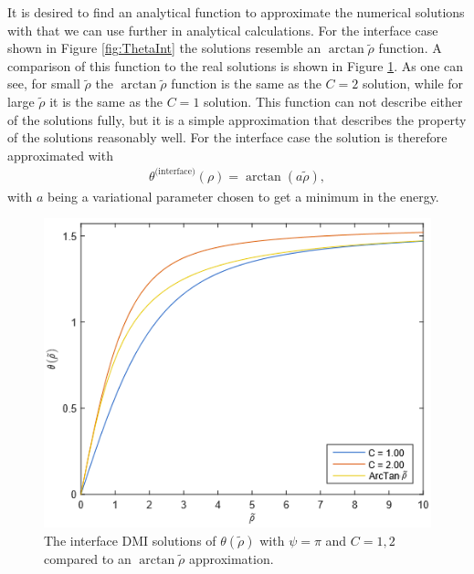 \documentclass[1p]{elsarticle}		%
\numberwithin{equation}{section}
\begin{document}
It is desired to find an analytical function to approximate the numerical solutions with that we can use further in analytical calculations. For the interface case shown in Figure \ref{fig:ThetaInt} the solutions resemble an $\arctan\tilde{\rho}$ function. A comparison of this function to the real solutions is shown in Figure \ref{fig:ThetaArcTan}. As one can see, for small $\tilde{\rho}$ the $\arctan\tilde{\rho}$ function is the same as the $C = 2$ solution, while for large $\tilde{\rho}$ it is the same as the $C = 1$ solution. This function can not describe either of the solutions fully, but it is a simple approximation that describes the property of the solutions reasonably well. For the interface case the solution is therefore approximated with
\begin{align}
\theta^{\text{(interface)}}(\rho) = \arctan(a\tilde{\rho}),
\end{align}
with $a$ being a variational parameter chosen to get a minimum in the energy.

\begin{figure}[h!]
\centering
  \includegraphics[width=.6\linewidth]{Figures/ThetaRhoArcTan.png}
\caption{The interface DMI solutions of $\theta(\tilde{\rho})$ with $\psi = \pi$ and $C = 1,2$ compared to an $\arctan\tilde{\rho}$ approximation.}
\label{fig:ThetaArcTan}
\end{figure}
\end{document}
